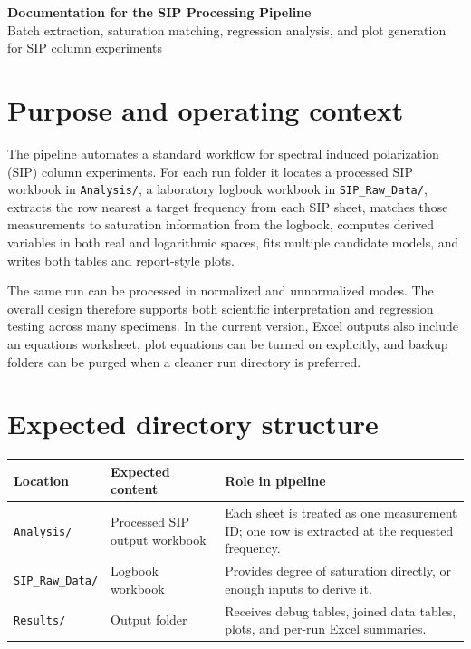 \documentclass[11pt]{article}
\begin{document}
\begin{center}
{\LARGE\bfseries\color{accent} Documentation for the SIP Processing Pipeline}\\[0.4em]
{\large Batch extraction, saturation matching, regression analysis, and plot generation for SIP column experiments}
\end{center}

\section{Purpose and operating context}
The pipeline automates a standard workflow for spectral induced polarization (SIP) column experiments. For each run folder it locates a processed SIP workbook in \texttt{Analysis/}, a laboratory logbook workbook in \texttt{SIP\_Raw\_Data/}, extracts the row nearest a target frequency from each SIP sheet, matches those measurements to saturation information from the logbook, computes derived variables in both real and logarithmic spaces, fits multiple candidate models, and writes both tables and report-style plots.

The same run can be processed in normalized and unnormalized modes. The overall design therefore supports both scientific interpretation and regression testing across many specimens. In the current version, Excel outputs also include an equations worksheet, plot equations can be turned on explicitly, and backup folders can be purged when a cleaner run directory is preferred.

\section{Expected directory structure}
\begin{longtable}{p{} p{} p{}}
\toprule
\textbf{Location} & \textbf{Expected content} & \textbf{Role in pipeline}\\
\midrule
\endhead
\texttt{Analysis/} & Processed SIP output workbook & Each sheet is treated as one measurement ID; one row is extracted at the requested frequency.\\
\texttt{SIP\_Raw\_Data/} & Logbook workbook & Provides degree of saturation directly, or enough inputs to derive it.\\
\texttt{Results/} & Output folder & Receives debug tables, joined data tables, plots, and per-run Excel summaries.\\
\bottomrule
\end{longtable}
\end{document}
